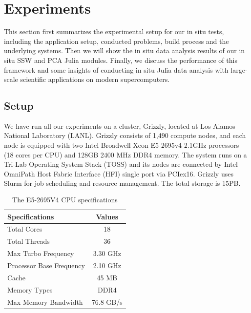 \documentclass{juliacon}
\begin{document}
\section{Experiments} \label{sec5}

This section first summarizes the experimental setup for our in situ tests, including the application setup, conducted problems, build process and the underlying systems. Then we will show the in situ data analysis results of our in situ SSW and PCA Julia modules. Finally, we discuss the performance of this framework and some insights of conducting in situ Julia data analysis with large-scale scientific applications on modern supercomputers.


\subsection{Setup}

We have run all our experiments on a cluster, Grizzly, located at Los Alamos National Laboratory (LANL). Grizzly consists of 1,490 compute nodes, and each node is equipped with two Intel Broadwell Xeon E5-2695v4 2.1GHz processors (18 cores per CPU) and 128GB 2400 MHz DDR4 memory.
The system runs on a Tri-Lab Operating System Stack (TOSS) and its nodes are connected by Intel OmniPath Host Fabric Interface (HFI) single port via PCIex16.
Grizzly uses Slurm for job scheduling and resource management. The total storage is 15PB.



\begin{table}
\centering 
  \caption{The E5-2695V4 CPU specifications}
  \label{table:layout}
  \begin{tabular}{lc}
 \toprule
  Specifications & Values \\
 \midrule
 Total Cores  & 18 \\
 Total Threads  & 36\\
 Max Turbo Frequency   & 3.30 GHz\\
 Processor Base Frequency & 2.10 GHz\\
 Cache   & 45 MB\\
 Memory Types  & DDR4\\
 Max Memory Bandwidth & 76.8 GB/s\\
 \bottomrule
\end{tabular}
\end{table}
\end{document}
